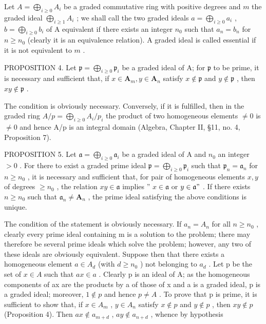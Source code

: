 Let \(A = \bigoplus_{i \geqslant 0} A_i\) be a graded commutative ring with positive degrees and \(m\) the graded ideal \(\bigoplus_{i \geqslant 1} A_i\) ; we shall call the two graded ideals \(a = \bigoplus_{i \geqslant 0} a_i\) , \(b = \bigoplus_{i \geqslant 0} b_i\) of A equivalent if there exists an integer \(n_0\) such that \(a_n = b_n\) for \(n \geqslant n_0\) (clearly it is an equivalence relation). A graded ideal is called essential if it is not equivalent to \(m\) .

PROPOSITION 4. Let \(\mathfrak{p} = \bigoplus_{i\geqslant 0}\mathfrak{p}_i\) be a graded ideal of A; for \(\mathfrak{p}\) to be prime, it is necessary and sufficient that, if \(x\in \mathbf{A}_m,y\in \mathbf{A}_n\) satisfy \(x\notin \mathfrak{p}\) and \(y\notin \mathfrak{p}\) , then \(xy\notin \mathfrak{p}\) .

The condition is obviously necessary. Conversely, if it is fulfilled, then in the graded ring \(A/p = \bigoplus_{i \geq 0} A_i/p_i\) the product of two homogeneous elements \(\neq 0\) is \(\neq 0\) and hence A/p is an integral domain (Algebra, Chapter II, §11, no. 4, Proposition 7).

PROPOSITION 5. Let \(\mathfrak{a} = \bigoplus_{i\geqslant 0}\mathfrak{a}_i\) be a graded ideal of A and \(n_0\) an integer \(>0\) . For there to exist a graded prime ideal \(\mathfrak{p} = \bigoplus_{i\geqslant 0}\mathfrak{p}_i\) such that \(\mathfrak{p}_n = \mathfrak{a}_n\) for \(n\geqslant n_0\) , it is necessary and sufficient that, for pair of homogeneous elements \(x,y\) of degrees \(\geqslant n_0\) , the relation \(xy\in \mathfrak{a}\) implies '' \(x\in \mathfrak{a}\) or \(y\in \mathfrak{a}"\) . If there exists \(n\geqslant n_0\) such that \(\mathfrak{a}_n\neq \mathbf{A}_n\) , the prime ideal satisfying the above conditions is unique.

The condition of the statement is obviously necessary. If \(a_{n} = A_{n}\) for all \(n \geqslant n_{0}\) , clearly every prime ideal containing m is a solution to the problem; there may therefore be several prime ideals which solve the problem; however, any two of these ideals are obviously equivalent. Suppose then that there exists a homogeneous element \(a \in A_{d}\) (with \(d \geqslant n_{0}\) ) not belonging to \(a_{d}\) . Let p be the set of \(x \in A\) such that \(ax \in a\) . Clearly p is an ideal of A; as the homogeneous components of ax are the products by a of those of x and a is a graded ideal, p is a graded ideal; moreover, \(1 \notin p\) and hence \(p \neq A\) . To prove that p is prime, it is sufficient to show that, if \(x \in A_{m}\) , \(y \in A_{n}\) satisfy \(x \notin p\) and \(y \notin p\) , then \(xy \notin p\) (Proposition 4). Then \(ax \notin a_{m+d}\) , \(ay \notin a_{n+d}\) , whence by hypothesis


